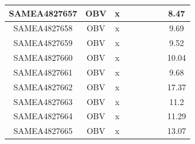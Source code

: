 \documentclass[../main.tex]{subfiles}
\begin{document}
\begin{flushleft}
\begin{footnotesize}
\begin{longtable}{|c|c|c|c|c|c|c|}
    \hline
    SAMEA4827657  & OBV   & x                                                            & ~          & ~                                                                           & ~                                                                 & 8.47      \\ 
    \hline
    SAMEA4827658  & OBV   & x                                                            & ~          & ~                                                                           & ~                                                                 & 9.69      \\ 
    \hline
    SAMEA4827659  & OBV   & x                                                            & ~          & ~                                                                           & ~                                                                 & 9.52      \\ 
    \hline
    SAMEA4827660  & OBV   & x                                                            & ~          & ~                                                                           & ~                                                                 & 10.04     \\ 
    \hline
    SAMEA4827661  & OBV   & x                                                            & ~          & ~                                                                           & ~                                                                 & 9.68      \\ 
    \hline
    SAMEA4827662  & OBV   & x                                                            & ~          & ~                                                                           & ~                                                                 & 17.37     \\ 
    \hline
    SAMEA4827663  & OBV   & x                                                            & ~          & ~                                                                           & ~                                                                 & 11.2      \\ 
    \hline
    SAMEA4827664  & OBV   & x                                                            & ~          & ~                                                                           & ~                                                                 & 11.29     \\ 
    \hline
    SAMEA4827665  & OBV   & x                                                            & ~          & ~                                                                           & ~                                                                 & 13.07     \\ 

\end{longtable}
\end{footnotesize}
\end{flushleft}
\end{document}
